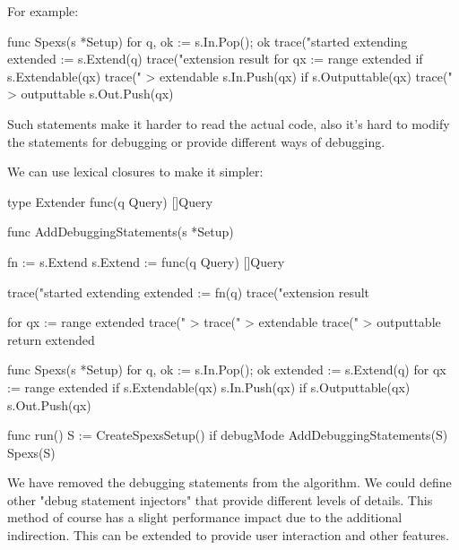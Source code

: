 For example:

\begin{file}
func Spexs(s *Setup) {
    for q, ok := s.In.Pop(); ok {
        trace("started extending %
        extended := s.Extend(q)
        trace("extension result %
        for qx := range extended {
            if s.Extendable(qx) {
                trace(" > extendable %
                s.In.Push(qx)
            }
            if s.Outputtable(qx) {
                trace(" > outputtable %
                s.Out.Push(qx)
            }
        }
    }
}
\end{file}

Such statements make it harder to read the actual code, also it's hard to modify the statements for debugging or provide different ways of debugging.

We can use lexical closures to make it simpler:

\begin{file}
type Extender func(q Query) []Query

func AddDebuggingStatements(s *Setup) {
    fn := s.Extend
    s.Extend := func(q Query) []Query {
        trace("started extending %
        extended := fn(q)
        trace("extension result %
        
        for qx := range extended {
            trace(" > %
            trace(" > extendable %
            trace(" > outputtable %
        }
        return extended
    }
}

func Spexs(s *Setup) {
    for q, ok := s.In.Pop(); ok {
        extended := s.Extend(q)
        for qx := range extended {
            if s.Extendable(qx) {
                s.In.Push(qx)
            }
            if s.Outputtable(qx) {
                s.Out.Push(qx)
            }
        }
    }
}

func run(){
    S := CreateSpexsSetup()
    if debugMode {
        AddDebuggingStatements(S)
    }
    Spexs(S)
}
\end{file}

We have removed the debugging statements from the algorithm. We could define other "debug statement injectors" that provide different levels of details. This method of course has a slight performance impact due to the additional indirection. This can be extended to provide user interaction and other features.